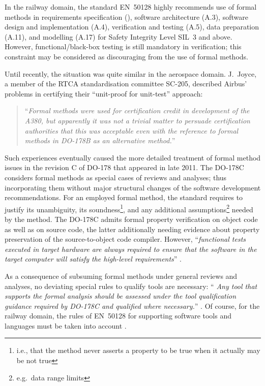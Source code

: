 In the railway domain, the standard
EN~50128 highly recommends use of formal methods in
requirements specification (\cite[Table A.2]{en50128}),
software architecture (A.3),
software design and implementation (A.4),
verification and testing (A.5),
data preparation (A.11), and
modelling (A.17)
for Safety Integrity Level SIL~3 and above.
%
However, functional\slash black-box testing is still mandatory in
verification; this constraint may be considered as discouraging from
the use of formal methods.

Until recently, the situation was quite similar in the aerospace
domain.
%
J.\ Joyce, a member of the RTCA
standardisation committee SC-205, described
Airbus' problems in certifying their ``unit-proof for unit-test''
approach:

        \begin{quote}
        ``{\em Formal methods were used for certification credit in
        development of the A380, but apparently it was not a trivial
        matter to persuade certification authorities that this was
        acceptable even with the reference to formal methods in
        DO-178B as an alternative method.}''
        \end{quote}


Such experiences eventually caused the more detailed treatment of
formal method issues in the revision C of DO-178 that appeared in
late 2011.
%
The DO-178C considers formal methods as special cases of
reviews and analyses; thus incorporating them without major
structural changes of the software development recommendations.
%
For an employed formal method, the standard requires to justify its
unambiguity, its soundness\footnote{
        i.e., that the method never asserts a property to be true
        when it actually may be not true
},
and any additional assumptions\footnote{
        e.g.\ data range limits
}
needed by the method.
%
The DO-178C admits formal property verification on object code
as well as on source code, the latter additionally needing
evidence about property preservation of the source-to-object
code compiler.
%
However, ``{\em functional tests
executed in target hardware are always required to ensure that the
software in the target computer will satisfy the high-level requirements}''
\cite[FM.12.3.5]{DO-333}.

As a consequence of subsuming formal methods under general reviews and
analyses, no deviating special rules to qualify tools are necessary:
``{\em
Any tool that supports the formal analysis should be assessed under
the tool qualification
guidance required by DO-178C and qualified where necessary.}''
\cite[FM.1.6.2]{DO-333}.
Of course, for the railway domain, the rules of EN~50128 for supporting
software tools and languages must be taken into account
\cite[Section~6.7]{en50128}.


